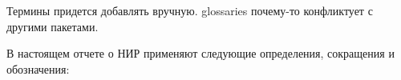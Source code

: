 
Термины придется добавлять вручную. glossaries почему-то конфликтует с другими пакетами.

В настоящем отчете о НИР применяют следующие определения, сокращения и обозначения: